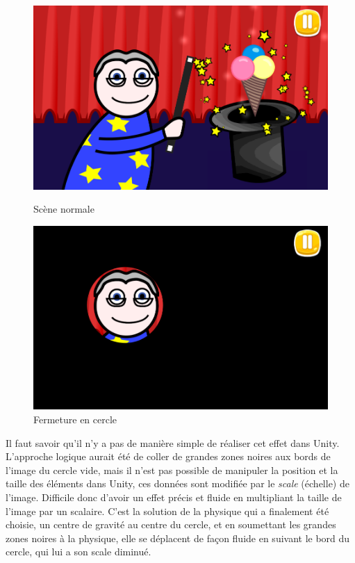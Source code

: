 \begin{figure}[H]\centering
   \begin{minipage}{0.49\textwidth}\centering
     \includegraphics[scale=0.2]{./img/scene.png}
     \caption{Scène normale}
     \label{regular_scene}
   \end{minipage}
   \begin {minipage}{0.49\textwidth}\centering
     \includegraphics[scale=0.2]{./img/cartoon.png}
     \caption{Fermeture en cercle}
     \label{cartoon}
   \end{minipage}
\end{figure}

Il faut savoir qu'il n'y a pas de manière simple de réaliser cet effet dans Unity. L'approche logique aurait été de coller de grandes zones noires aux bords de l'image du cercle vide, mais il n'est pas possible de manipuler la position et la taille des éléments dans Unity, ces données sont modifiée par le \textit{scale} (échelle) de l'image. Difficile donc d'avoir un effet précis et fluide en multipliant la taille de l'image par un scalaire. C'est la solution de la physique qui a finalement été choisie, un centre de gravité au centre du cercle, et en soumettant les grandes zones noires à la physique, elle se déplacent de façon fluide en suivant le bord du cercle, qui lui a son scale diminué.

